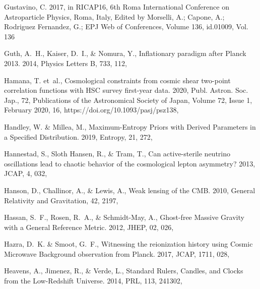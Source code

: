 \documentclass[longauth,traditabstract]{aa}
\def\prl{{PRL}}
\def\jcap{{JCAP}}
\begin{document}
\begin{thebibliography}{379}
{Gustavino}, C. 2017, in RICAP16, 6th Roma International Conference on
  Astroparticle Physics, Roma, Italy, Edited by Morselli, A.; Capone, A.;
  Rodriguez Fernandez, G.; EPJ Web of Conferences, Volume 136, id.01009, Vol.
  136

{Guth}, A.~H., {Kaiser}, D.~I., \& {Nomura}, Y., {Inflationary paradigm after
  Planck 2013}. 2014, Physics Letters B, 733, 112, 

Hamana, T. {et~al.}, {Cosmological constraints from cosmic shear two-point
  correlation functions with HSC survey first-year data}. 2020, Publ. Astron.
  Soc. Jap., 72, Publications of the Astronomical Society of Japan, Volume 72,
  Issue 1, February 2020, 16, https://doi.org/10.1093/pasj/psz138,

Handley, W. \& Millea, M., {Maximum-Entropy Priors with Derived Parameters in a
  Specified Distribution}. 2019, Entropy, 21, 272, 

{Hannestad}, S., {Sloth Hansen}, R., \& {Tram}, T., {Can active-sterile
  neutrino oscillations lead to chaotic behavior of the cosmological lepton
  asymmetry?} 2013, \jcap, 4, 032, 

Hanson, D., Challinor, A., \& Lewis, A., {Weak lensing of the CMB}. 2010,
  General Relativity and Gravitation, 42, 2197, 

Hassan, S.~F., Rosen, R.~A., \& Schmidt-May, A., {Ghost-free Massive Gravity
  with a General Reference Metric}. 2012, JHEP, 02, 026, 

Hazra, D.~K. \& Smoot, G.~F., {Witnessing the reionization history using Cosmic
  Microwave Background observation from Planck}. 2017, JCAP, 1711, 028,

{Heavens}, A., {Jimenez}, R., \& {Verde}, L., {Standard Rulers, Candles, and
  Clocks from the Low-Redshift Universe}. 2014, \prl, 113, 241302,


\end{thebibliography}
\end{document}

